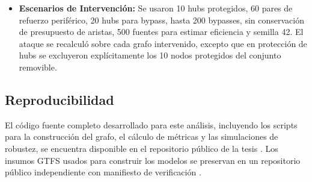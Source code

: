 \begin{itemize}
\begin{itemize}
                \end{itemize}
                \item \textbf{Escenarios de Intervención:} Se usaron 10 hubs protegidos, 60 pares de refuerzo periférico, 20 hubs para bypass, hasta 200 bypasses, sin conservación de presupuesto de aristas, 500 fuentes para estimar eficiencia y semilla 42. El ataque se recalculó sobre cada grafo intervenido, excepto que en protección de hubs se excluyeron explícitamente los 10 nodos protegidos del conjunto removible.
            \end{itemize}

        \subsection{Reproducibilidad}

            El código fuente completo desarrollado para este análisis, incluyendo los scripts para la construcción del grafo, el cálculo de métricas y las simulaciones de robustez, se encuentra disponible en el repositorio público de la tesis \cite{betancourt_tesis_repo2026}. Los insumos GTFS usados para construir los modelos se preservan en un repositorio público independiente con manifiesto de verificación \cite{betancourt_gtfs_amg2024}.
